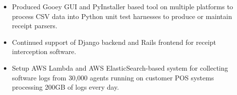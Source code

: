 \documentclass[10pt,letter,ragged2e]{altacv}
\begin{document}
\begin{paracol}{2}
\begin{itemize}
\item Produced Gooey GUI and PyInstaller based tool on multiple platforms to process CSV data into Python unit test harnesses to produce or maintain receipt parsers.
\item Continued support of Django backend and Rails frontend for receipt interception software.
\item Setup AWS Lambda and AWS ElasticSearch-based system for collecting software logs from 30,000 agents running on customer POS systems processing 200GB of logs every day.
\end{itemize}

\divider



\end{paracol}
\end{document}
